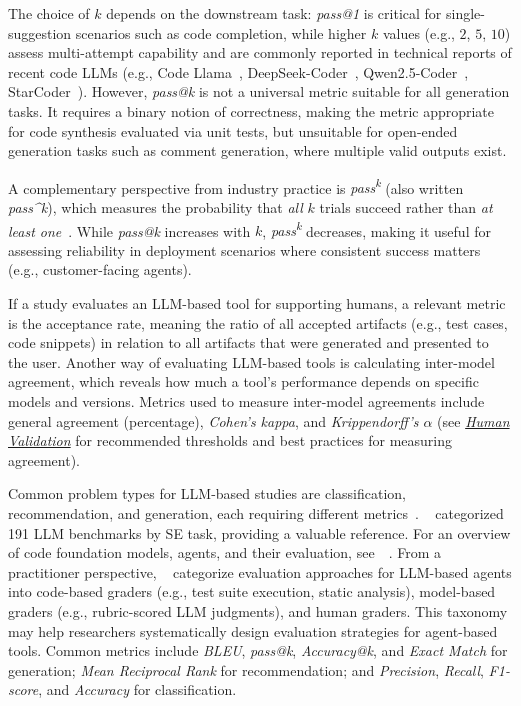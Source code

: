 \documentclass[smallextended]{svjour3}
\newcommand{\humanvalidation}{\hyperref[sec:use-human-validation-for-llm-outputs]{\emph{Human Validation}}\xspace}
\newcommand{\humanvalidation}{\href{/guidelines\#use-human-validation-for-llm-outputs}{\emph{Human Validation}}\xspace}
\begin{document}
The choice of $k$ depends on the downstream task: \emph{pass@1} is critical for single-suggestion scenarios such as code completion, while higher $k$ values (e.g., $2$, $5$, $10$) assess multi-attempt capability and are commonly reported in technical reports of recent code LLMs (e.g., Code Llama~\cite{DBLP:journals/corr/abs-2308-12950}, DeepSeek-Coder~\cite{DBLP:journals/corr/abs-2401-14196}, Qwen2.5-Coder~\cite{DBLP:journals/corr/abs-2409-12186}, StarCoder~\cite{DBLP:journals/tmlr/LiAZMKMMALCLZZW23}).
However, \emph{pass@k} is not a universal metric suitable for all generation tasks.
It requires a binary notion of correctness, making the metric appropriate for code synthesis evaluated via unit tests, but unsuitable for open-ended generation tasks such as comment generation, where multiple valid outputs exist.

A complementary perspective from industry practice is \emph{pass\textsuperscript{k}} (also written \emph{pass\^{}k}), which measures the probability that \emph{all} $k$ trials succeed rather than \emph{at least one}~\cite{Anthropic2025evals}. While \emph{pass@k} increases with $k$, \emph{pass\textsuperscript{k}} decreases, making it useful for assessing reliability in deployment scenarios where consistent success matters (e.g., customer-facing agents).

If a study evaluates an LLM-based tool for supporting humans, a relevant metric is the acceptance rate, meaning the ratio of all accepted artifacts (e.g., test cases, code snippets) in relation to all artifacts that were generated and presented to the user.
Another way of evaluating LLM-based tools is calculating inter-model agreement, which reveals how much a tool's performance depends on specific models and versions.
Metrics used to measure inter-model agreements include general agreement (percentage), \emph{Cohen's kappa}, and \emph{Krippendorff's $\alpha$} (see \humanvalidation for recommended thresholds and best practices for measuring agreement).

Common problem types for LLM-based studies are classification, recommendation, and generation, each requiring different metrics~\cite{DBLP:journals/tosem/HouZLYWLLLGW24}. \citeauthor{DBLP:journals/corr/abs-2505-08903}~\cite{DBLP:journals/corr/abs-2505-08903} categorized 191 LLM benchmarks by SE task, providing a valuable reference. For an overview of code foundation models, agents, and their evaluation, see~\citeauthor{yang2025code}~\cite{yang2025code}. From a practitioner perspective, \citeauthor{Anthropic2025evals}~\cite{Anthropic2025evals} categorize evaluation approaches for LLM-based agents into code-based graders (e.g., test suite execution, static analysis), model-based graders (e.g., rubric-scored LLM judgments), and human graders. This taxonomy may help researchers systematically design evaluation strategies for agent-based tools. Common metrics include \emph{BLEU}, \emph{pass@k}, \emph{Accuracy@k}, and \emph{Exact Match} for generation; \emph{Mean Reciprocal Rank} for recommendation; and \emph{Precision}, \emph{Recall}, \emph{F1-score}, and \emph{Accuracy} for classification.
\end{document}
